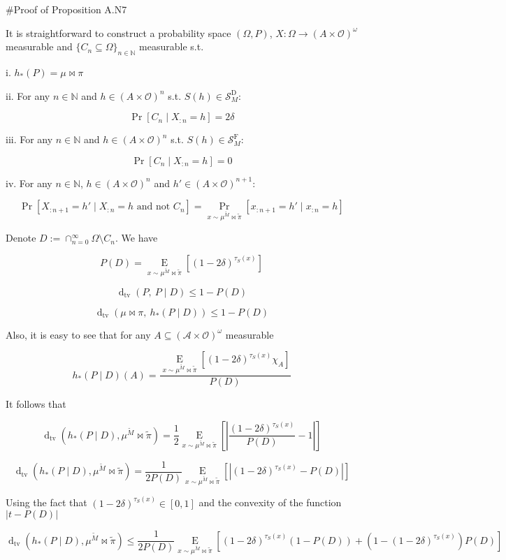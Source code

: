 \documentclass[a4paper]{article}
\newcommand{\AP}[1]{\left(#1\right)}
\newcommand{\AB}[1]{\left[#1\right]}
\newcommand{\Pa}[2]{\underset{#1}{\operatorname{Pr}}\AB{#2}}
\newcommand{\Ea}[2]{\underset{#1}{\operatorname{E}}\AB{#2}}
\newcommand{\Dtva}[1]{\operatorname{d}_{\text{tv}}\AP{#1}}
\newcommand{\Nats}{\mathbb{N}}
\newcommand{\Sq}[2]{\{#1\}_{#2 \in \Nats}}
\newcommand{\Sqn}[1]{\Sq{#1}{n}}
\newcommand{\Abs}[1]{\left\vert #1 \right\vert}
\newcommand{\Ob}{\mathcal{O}}
\newcommand{\A}{\mathcal{A}}
\newcommand{\St}{\mathcal{S}}
\newcommand{\RMD}{\mathrm{D}}
\newcommand{\RMF}{\mathrm{F}}
\newcommand{\SF}{\St^{\RMF}}
\newcommand{\SD}{\St^{\RMD}}
\begin{document}
\#Proof of Proposition A.N7

It is straightforward to construct a probability space $(\Omega,P)$, $X: \Omega \rightarrow (A \times \Ob)^\omega$ measurable and $\Sqn{C_n \subseteq \Omega}$ measurable s.t.

i. $h_*(P) = \mu\bowtie\pi$

ii. For any $n \in \Nats$ and $h \in (A \times \Ob)^n$ s.t. $S(h) \in \SD_M$: 

$$\Pa{}{C_n \mid X_{:n} = h} = 2\delta$$

iii. For any $n \in \Nats$ and $h \in (A \times \Ob)^n$ s.t. $S(h) \in \SF_M$: 

$$\Pa{}{C_n \mid X_{:n} = h} = 0$$

iv. For any $n \in \Nats$, $h \in (A \times \Ob)^n$ and $h' \in (A \times \Ob)^{n+1}$:

$$\Pa{}{X_{:n+1}=h' \mid X_{:n} = h \text{ and not } C_n} = \Pa{x \sim \mu^{\tilde{M}}\bowtie\tilde{\pi}}{x_{:n+1}=h' \mid x_{:n} = h}$$

Denote $D:=\cap_{n=0}^\infty \Omega \setminus C_n$. We have

$$P(D) = \Ea{x\sim\mu^{\tilde{M}}\bowtie\tilde{\pi}}{\AP{1-2\delta}^{\tau_S(x)}}$$

$$\Dtva{P,\ P \mid D} \leq 1 - P(D)$$

$$\Dtva{\mu\bowtie\pi,\ h_*\AP{P \mid D}} \leq 1 - P(D)$$

Also, it is easy to see that for any $A \subseteq (\A \times \Ob)^\omega$ measurable

$$h_*\AP{P \mid D}(A)=\frac{\Ea{x\sim\mu^{\tilde{M}}\bowtie\tilde{\pi}}{\AP{1-2\delta}^{\tau_S(x)}\chi_A}}{P(D)}$$

It follows that

$$\Dtva{h_*\AP{P \mid D},\mu^{\tilde{M}}\bowtie\tilde{\pi}} = \frac{1}{2}\Ea{x\sim\mu^{\tilde{M}}\bowtie\tilde{\pi}}{\Abs{\frac{\AP{1-2\delta}^{\tau_S(x)}}{P(D)}-1}}$$

$$\Dtva{h_*\AP{P \mid D},\mu^{\tilde{M}}\bowtie\tilde{\pi}} = \frac{1}{2P(D)}\Ea{x\sim\mu^{\tilde{M}}\bowtie\tilde{\pi}}{\Abs{\AP{1-2\delta}^{\tau_S(x)}-P(D)}}$$

Using the fact that $\AP{1-2\delta}^{\tau_S(x)}\in[0,1]$ and the convexity of the function $\Abs{t-P(D)}$

$$\Dtva{h_*\AP{P \mid D},\mu^{\tilde{M}}\bowtie\tilde{\pi}} \leq \frac{1}{2P(D)}\Ea{x\sim\mu^{\tilde{M}}\bowtie\tilde{\pi}}{\AP{1-2\delta}^{\tau_S(x)}\AP{1-P(D)}+\AP{1-\AP{1-2\delta}^{\tau_S(x)}}P(D)}$$
\end{document}
